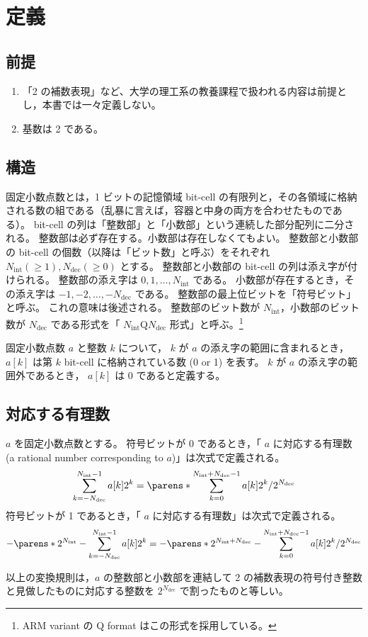 \chapter{定義}
    \newcommand{\Ni}{{N_\mathrm{int}}}
    \newcommand{\Nd}{{N_\mathrm{dec}}}
    \section{前提}
        \label{fxd-pt_num::def::prem}
        \begin{enumerate}
            \item 「2 の補数表現」など、大学の理工系の教養課程で扱われる内容は前提とし，本書では一々定義しない。
            \item 基数は 2 である。
        \end{enumerate}
    \section{構造}
        固定小数点数とは，1 ビットの記憶領域 bit-cell の有限列と，その各領域に格納される数の組である（乱暴に言えば，容器と中身の両方を合わせたものである）。
        bit-cell の列は「整数部」と「小数部」という連続した部分配列に二分される。
        整数部は必ず存在する。小数部は存在しなくてもよい。
        整数部と小数部の bit-cell の個数（以降は「ビット数」と呼ぶ）をそれぞれ $\Ni(\geq 1), \Nd(\geq 0)$ とする。
        整数部と小数部の bit-cell の列は添え字が付けられる。
        整数部の添え字は $0,1,\dots,\Ni$ である。
        小数部が存在するとき，その添え字は $-1,-2,\dots,-\Nd$ である。
        整数部の最上位ビットを「符号ビット」と呼ぶ。
        これの意味は後述される。
        整数部のビット数が $\Ni$，小数部のビット数が $\Nd$ である形式を「 $\Ni$Q$\Nd$ 形式」と呼ぶ。\footnote{ARM variant の Q format はこの形式を採用している。}
        \par
        固定小数点数 $a$ と整数 $k$ について， $k$ が $a$ の添え字の範囲に含まれるとき，$a[k]$ は第 $k$ bit-cell に格納されている数 (0 or 1) を表す。
        $k$ が $a$ の添え字の範囲外であるとき， $a[k]$ は 0 であると定義する。
    \section{対応する有理数}
        $a$ を固定小数点数とする。
        符号ビットが 0 であるとき，「 $a$ に対応する有理数 (a rational number corresponding to $a$)」は次式で定義される。
        \[ \sum_{k=-\Nd}^{\Ni-1} a[k]2^k = \parens*{\sum_{k=0}^{\Ni+\Nd-1} a[k]2^k}/2^\Nd \]
        符号ビットが 1 であるとき，「 $a$ に対応する有理数」は次式で定義される。
        \[ -\parens*{2^\Ni - \sum_{k=-\Nd}^{\Ni-1} a[k]2^k} = -\parens*{2^{\Ni+\Nd} - \sum_{k=0}^{\Ni+\Nd-1} a[k]2^k}/2^\Nd \]
        \par
        以上の変換規則は，$a$ の整数部と小数部を連結して 2 の補数表現の符号付き整数と見做したものに対応する整数を $2^\Nd$ で割ったものと等しい。
